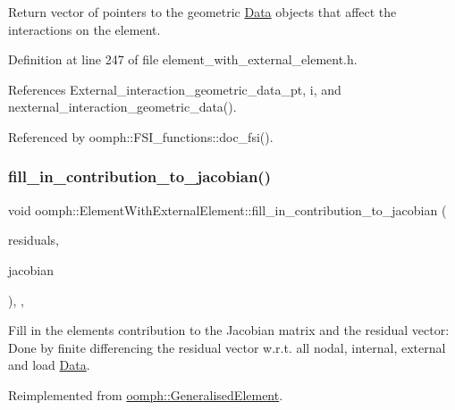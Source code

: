Return vector of pointers to the geometric \hyperlink{classoomph_1_1Data}{Data} objects that affect the interactions on the element. 



Definition at line 247 of file element\+\_\+with\+\_\+external\+\_\+element.\+h.



References External\+\_\+interaction\+\_\+geometric\+\_\+data\+\_\+pt, i, and nexternal\+\_\+interaction\+\_\+geometric\+\_\+data().



Referenced by oomph\+::\+F\+S\+I\+\_\+functions\+::doc\+\_\+fsi().

\mbox{\label{classoomph_1_1ElementWithExternalElement_ae5fb09552a8271e891438f8d058ca1b8}} 
\subsubsection{\texorpdfstring{fill\+\_\+in\+\_\+contribution\+\_\+to\+\_\+jacobian()}{fill\_in\_contribution\_to\_jacobian()}}
{\footnotesize\ttfamily void oomph\+::\+Element\+With\+External\+Element\+::fill\+\_\+in\+\_\+contribution\+\_\+to\+\_\+jacobian (\begin{DoxyParamCaption}\item[{\hyperlink{classoomph_1_1Vector}{Vector}$<$ double $>$ \&}]{residuals,  }\item[{\hyperlink{classoomph_1_1DenseMatrix}{Dense\+Matrix}$<$ double $>$ \&}]{jacobian }\end{DoxyParamCaption})\hspace{0.3cm}{\ttfamily [inline]}, {\ttfamily [protected]}, {\ttfamily [virtual]}}

Fill in the element\textquotesingle{}s contribution to the Jacobian matrix and the residual vector\+: Done by finite differencing the residual vector w.\+r.\+t. all nodal, internal, external and load \hyperlink{classoomph_1_1Data}{Data}. 

Reimplemented from \hyperlink{classoomph_1_1GeneralisedElement_a6ae09fc0d68e4309ac1b03583d252845}{oomph\+::\+Generalised\+Element}.



